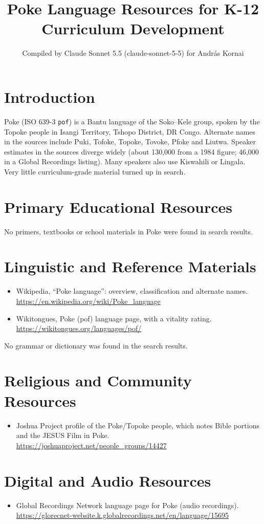 \documentclass[12pt]{article}
\title{Poke Language Resources for K-12 Curriculum Development}
\author{Compiled by Claude Sonnet 5.5 (claude-sonnet-5-5) for Andr\'as Kornai}
\date{}
\begin{document}
\maketitle

\section{Introduction}
Poke (ISO 639-3 \texttt{pof}) is a Bantu language of the Soko--Kele group, spoken by the Topoke people in Isangi Territory, Tshopo District, DR Congo. Alternate names in the sources include Puki, Tofoke, Topoke, Tovoke, Pfoke and Liutwa. Speaker estimates in the sources diverge widely (about 130,000 from a 1984 figure; 46,000 in a Global Recordings listing). Many speakers also use Kiswahili or Lingala. Very little curriculum-grade material turned up in search.

\section{Primary Educational Resources}
No primers, textbooks or school materials in Poke were found in search results.

\section{Linguistic and Reference Materials}
\begin{itemize}
\item Wikipedia, ``Poke language'': overview, classification and alternate names. \url{https://en.wikipedia.org/wiki/Poke_language}
\item Wikitongues, Poke (pof) language page, with a vitality rating. \url{https://wikitongues.org/languages/pof/}
\end{itemize}
No grammar or dictionary was found in the search results.

\section{Religious and Community Resources}
\begin{itemize}
\item Joshua Project profile of the Poke/Topoke people, which notes Bible portions and the JESUS Film in Poke. \url{https://joshuaproject.net/people_groups/14427}
\end{itemize}

\section{Digital and Audio Resources}
\begin{itemize}
\item Global Recordings Network language page for Poke (audio recordings). \url{https://glorecnet-website.k.globalrecordings.net/en/language/15695}
\end{itemize}
\end{document}
